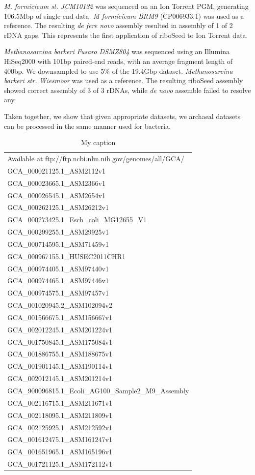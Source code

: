 \documentclass[11pt]{article}
\begin{document}
\textit{M. formicicum st. JCM10132} was sequenced on an Ion Torrent PGM, generating 106.5Mbp of single-end data. \textit{M formicicum BRM9} (CP006933.1) was used as a reference. The resulting \textit{de fere novo} assembly resulted in assembly of 1 of 2 rDNA gaps. This represents the first application of riboSeed to Ion Torrent data.


\textit{Methanosarcina barkeri Fusaro DSMZ804} was sequenced using an Illumina HiSeq2000 with 101bp paired-end reads, with an average fragment length of 400bp. We downsampled to use 5\% of the 19.4Gbp dataset. \textit{Methanosarcina barkeri str. Wiesmoor} was used as a reference. The resulting riboSeed assembly showed correct assembly of 3 of 3 rDNAs, while \textit{de novo} assemble failed to resolve any.


Taken together, we show that given appropriate datasets, we archaeal datasets can be processed in the same manner used for bacteria.

\begin{table}[]
\centering
\caption{My caption}
\label{accessions}
\begin{tabular}{l}
Available at ftp://ftp.ncbi.nlm.nih.gov/genomes/all/GCA/ \\
GCA\_000021125.1\_ASM2112v1 \\
GCA\_000023665.1\_ASM2366v1 \\
GCA\_000026545.1\_ASM2654v1 \\
GCA\_000262125.1\_ASM26212v1 \\
GCA\_000273425.1\_Esch\_coli\_MG12655\_V1 \\
GCA\_000299255.1\_ASM29925v1 \\
GCA\_000714595.1\_ASM71459v1 \\
GCA\_000967155.1\_HUSEC2011CHR1 \\
GCA\_000974405.1\_ASM97440v1 \\
GCA\_000974465.1\_ASM97446v1 \\
GCA\_000974575.1\_ASM97457v1 \\
GCA\_001020945.2\_ASM102094v2 \\
GCA\_001566675.1\_ASM156667v1 \\
GCA\_002012245.1\_ASM201224v1 \\
GCA\_001750845.1\_ASM175084v1 \\
GCA\_001886755.1\_ASM188675v1 \\
GCA\_001901145.1\_ASM190114v1 \\
GCA\_002012145.1\_ASM201214v1 \\
GCA\_900096815.1\_Ecoli\_AG100\_Sample2\_M9\_Assembly \\
GCA\_002116715.1\_ASM211671v1 \\
GCA\_002118095.1\_ASM211809v1 \\
GCA\_002125925.1\_ASM212592v1 \\
GCA\_001612475.1\_ASM161247v1 \\
GCA\_001651965.1\_ASM165196v1 \\
GCA\_001721125.1\_ASM172112v1
\end{tabular}
\end{table}
\end{document}

